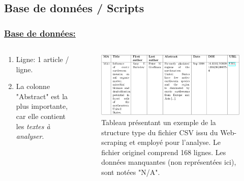 \documentclass[xcolor=dvipsnames]{beamer}
\begin{document}
	\subsection*{Base de données / Scripts} %
	\begin{frame}
		\frametitle{\underline{Base de données:}}
		\begin{columns}
			\begin{column}{0.4\textwidth} %
				\begin{enumerate}
					\item Ligne: 1 article / ligne.
					\item La colonne "Abstract" est la plus importante, car elle contient les \textit{textes à analyser}.
				\end{enumerate}
			\end{column}
			\begin{column}{0.6\textwidth}
				\begin{figure}[htb] %
					\begin{center} %
						\includegraphics[width=1\textwidth]{screenshotCSV.png}
						\caption{Tableau présentant un exemple de la structure type du fichier CSV issu du Web-scraping et
						employé pour l’analyse. Le fichier originel comprend 168 lignes. Les données manquantes (non représentées ici), sont
						notées "N/A".}\label{fig_exemple_bdd}
					\end{center}
				\end{figure}
			\end{column}
		\end{columns}
	\end{frame}
\end{document}
